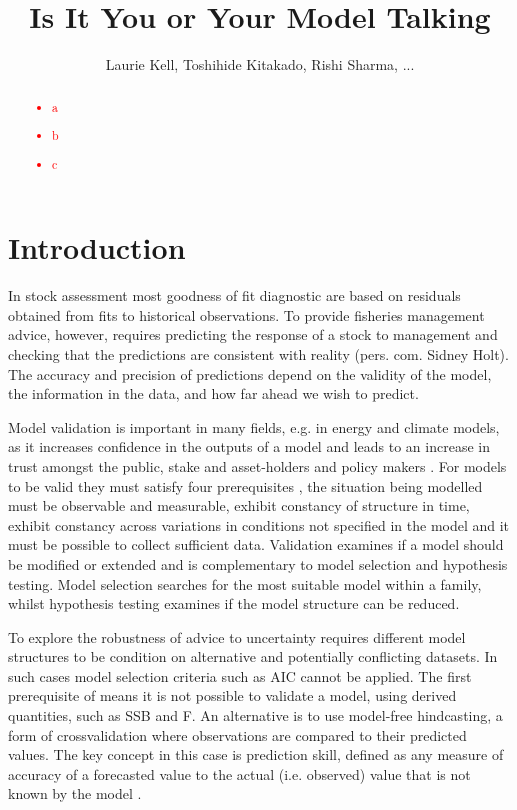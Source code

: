 \documentclass[a4paper]{article}
\title{Is It You or Your Model Talking}
\author{Laurie Kell, Toshihide Kitakado, Rishi Sharma, ...}
\newcommand{\laurie}{\textcolor{red}}
\newcommand{\laurie}{\textcolor{darkred}}
\begin{document}
\maketitle

\begin{abstract}

\laurie{
\begin{itemize}
    \item a
    \item b
    \item c
\end{itemize}
}

\end{abstract}

\section{Introduction}

In stock assessment most goodness of fit diagnostic are based on residuals obtained from fits to historical observations. To provide fisheries management advice, however, requires predicting the response of a stock to management and checking that the predictions are consistent with reality (pers. com. Sidney Holt). The accuracy and precision of predictions depend on the validity of the model, the information in the data, and how far ahead we wish to predict. 

Model validation is important in many fields, e.g. in energy and climate models, as it increases confidence in the outputs of a model and leads to an increase in trust amongst the public, stake and asset-holders and policy makers \citep{kellSubmitted}. For models to be valid they must satisfy four prerequisites \citep{hodge1992}, the situation being modelled must be observable and measurable, exhibit constancy of structure in time, exhibit constancy across variations in conditions not specified in the model and it must be possible to collect sufficient data. Validation examines if a model should be modified or extended and is complementary to model selection and hypothesis testing. Model selection searches for the most suitable model within a family, whilst hypothesis testing examines if the model structure can be reduced.

To explore the robustness of advice to uncertainty requires different model structures to be condition on alternative and potentially conflicting datasets. In such cases model selection criteria such as AIC cannot be applied. The first prerequisite of \cite{hodge} means it is not possible to validate a model, using derived quantities, such as SSB and F. An alternative is to use model-free hindcasting, a form of crossvalidation where observations are compared to their predicted values. The key concept in this case is prediction skill, defined as any measure of accuracy of a forecasted value to the actual (i.e. observed) value that is not known by the model \cite{Huschke1959}.
\end{document}
